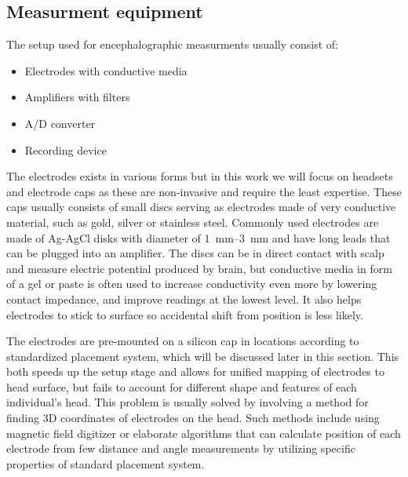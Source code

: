 \subsection{Measurment equipment}
The setup used for encephalographic measurments usually consist of: 
\begin{itemize}
  \item Electrodes with conductive media
  \item Amplifiers with filters
  \item A/D converter
  \item Recording device
\end{itemize}
The electrodes exists in various forms but in this work we will focus on
headsets and electrode caps as these are non-invasive and require the least
expertise. These caps usually consists of small discs serving as electrodes made
of very conductive material, such as gold, silver or stainless steel. Commonly
used electrodes are made of Ag-AgCl disks with diameter of \SIrange[range-units
= single]{1}{3}{\mm} and have long leads that can be plugged into an
amplifier. \cite{eegFund} The discs can be in direct contact with scalp and
measure electric potential produced by brain, but conductive media in form of a
gel or paste is often used to increase conductivity even more by lowering
contact impedance, and improve readings at the lowest level. It also helps
electrodes to stick to surface so accidental shift from position is less likely.

The electrodes are pre-mounted on a silicon cap in locations according to
standardized placement system, which will be discussed later in this section.
This both speeds up the setup stage and allows for unified mapping of electrodes
to head surface, but fails to account for different shape and features of each
individual's head. \cite{eegFund} This problem is usually solved by involving a
method for finding 3D coordinates of electrodes on the head. Such methods
include using magnetic field digitizer or elaborate algorithms that can
calculate position of each electrode from few distance and angle measurements by
utilizing specific properties of standard placement system. \cite{rapidPos}

